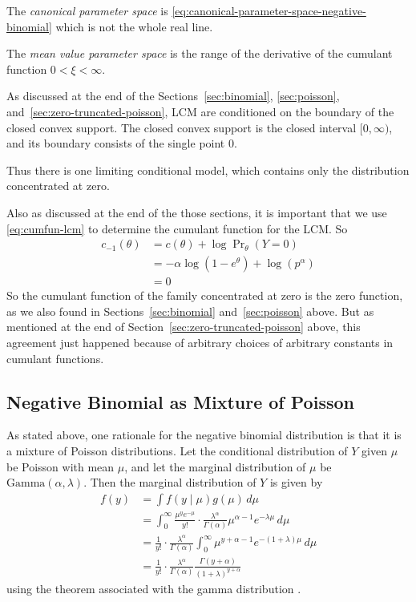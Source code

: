 The \emph{canonical parameter space}
is \eqref{eq:canonical-parameter-space-negative-binomial}
which is not the whole real line.

The \emph{mean value parameter space} is the range of the derivative of
the cumulant function $0 < \xi < \infty$.

As discussed at the end of the Sections~\ref{sec:binomial},
\ref{sec:poisson}, and~\ref{sec:zero-truncated-poisson}, LCM
are conditioned on the boundary of the closed convex support.
The closed convex support is the closed interval $[0, \infty)$, and its
boundary consists of the single point $0$.

Thus there is one limiting conditional model, which contains only
the distribution concentrated at zero.

Also as discussed at the end of the those sections,
it is important that we use \eqref{eq:cumfun-lcm} to determine the cumulant
function for the LCM.  So
\begin{align*}
   c_{- 1}(\theta)
   & =
   c(\theta) + \log \Pr\nolimits_\theta(Y = 0)
   \\
   & =
   - \alpha \log(1 - e^\theta)
   +
   \log \left(p^\alpha\right)
   \\
   & =
   0
\end{align*}
So the cumulant function of the family concentrated at zero is the zero
function, as we also found in Sections~\ref{sec:binomial} and~\ref{sec:poisson}
above.  But as mentioned at the end of Section~\ref{sec:zero-truncated-poisson}
above, this agreement just happened because of arbitrary choices of arbitrary
constants in cumulant functions.

\subsection{Negative Binomial as Mixture of Poisson}
\label{sec:mixture}

As stated above, one rationale for the negative binomial distribution is
that it is a mixture of Poisson distributions.  Let the conditional
distribution of $Y$ given $\mu$ be Poisson with mean $\mu$,
and let the marginal distribution of $\mu$ be $\text{Gamma}(\alpha, \lambda)$.
Then the marginal distribution of $Y$ is given by
\begin{align*}
   f(y)
   & =
   \int f(y \mid \mu) g(\mu) \, d \mu
   \\
   & =
   \int_0^\infty \frac{\mu^y e^{- \mu}}{y!} \cdot
   \frac{\lambda^\alpha}{\Gamma(\alpha)} \mu^{\alpha - 1} e^{- \lambda \mu}
   \, d \mu
   \\
   & =
   \frac{1}{y!}
   \cdot
   \frac{\lambda^\alpha}{\Gamma(\alpha)}
   \int_0^\infty \mu^{y + \alpha - 1} e^{- (1 + \lambda) \mu}
   \, d \mu
   \\
   & =
   \frac{1}{y!}
   \cdot
   \frac{\lambda^\alpha}{\Gamma(\alpha)}
   \frac{\Gamma(y + \alpha)}{(1 + \lambda)^{y + \alpha}}
\end{align*}
using the theorem associated with the gamma distribution
\citep{brand-name-distributions}.

